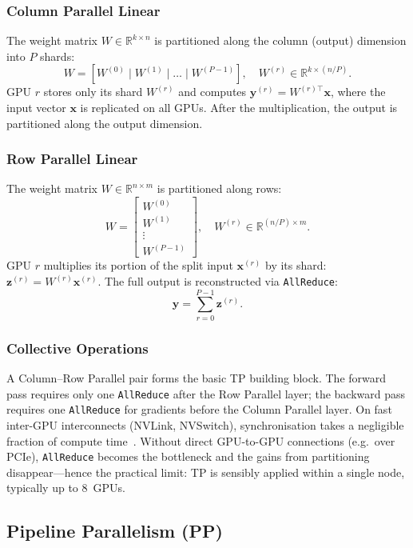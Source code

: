 \subsubsection{Column Parallel Linear}

The weight matrix $W \in \mathbb{R}^{k \times n}$ is partitioned along the
column (output) dimension into $P$ shards:
$$W = [W^{(0)} \mid W^{(1)} \mid \ldots \mid W^{(P-1)}], \quad
  W^{(r)} \in \mathbb{R}^{k \times (n/P)}.$$
GPU $r$ stores only its shard $W^{(r)}$ and computes
$\mathbf{y}^{(r)} = W^{(r)\top} \mathbf{x}$, where the input vector
$\mathbf{x}$ is replicated on all GPUs. After the multiplication, the output
is partitioned along the output dimension.

\subsubsection{Row Parallel Linear}

The weight matrix $W \in \mathbb{R}^{n \times m}$ is partitioned along rows:
$$W = \begin{bmatrix} W^{(0)} \\ W^{(1)} \\ \vdots \\ W^{(P-1)} \end{bmatrix},
  \quad W^{(r)} \in \mathbb{R}^{(n/P) \times m}.$$
GPU $r$ multiplies its portion of the split input $\mathbf{x}^{(r)}$
by its shard: $\mathbf{z}^{(r)} = W^{(r)} \mathbf{x}^{(r)}$.
The full output is reconstructed via \texttt{AllReduce}:
$$\mathbf{y} = \sum_{r=0}^{P-1} \mathbf{z}^{(r)}.$$

\subsubsection{Collective Operations}

A Column--Row Parallel pair forms the basic TP building block.
The forward pass requires only one \texttt{AllReduce} after the Row Parallel
layer; the backward pass requires one \texttt{AllReduce} for gradients before
the Column Parallel layer. On fast inter-GPU interconnects (NVLink, NVSwitch),
synchronisation takes a negligible fraction of compute
time~\cite{MegatronLM2020}. Without direct GPU-to-GPU connections (e.g.\ over
PCIe), \texttt{AllReduce} becomes the bottleneck and the gains from partitioning
disappear---hence the practical limit: TP is sensibly applied within a single
node, typically up to 8~GPUs.

\subsection{Pipeline Parallelism (PP)}

